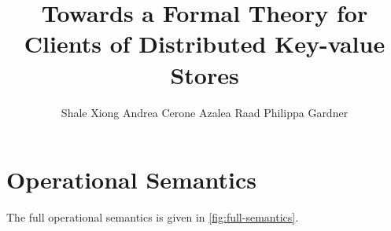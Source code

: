 \documentclass[runningheads]{llncs}
\newif\ifTechReport
\newcommand{\RootPath}{.}
\begin{document}
\title{
	Towards a Formal Theory for Clients of Distributed Key-value Stores
    } 


\author{%
Shale Xiong
Andrea Cerone
Azalea Raad
Philippa Gardner
}
%
%


\maketitle

\begin{abstract}
    
\end{abstract}





\ifTechReport




\fi

%




\newpage
\appendix
\ifTechReport
\else
\section{Operational Semantics}
\label{sec:full-semantics}
The full operational semantics is given in \cref{fig:full-semantics}.

\fi
\end{document}

